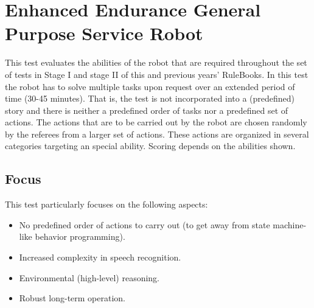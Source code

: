 %
%

\newcommand{\eegpsrTeams}{2~}
\newcommand{\eegpsrMaxCmd}{3~}
\newcommand{\eegpsrMaxCmdTime}{5~}
\newcommand{\eegpsrMaxTeamTime}{\eegpsrMaxCmd$\times$\eegpsrMaxCmdTime}

\section[EEGPSR]{Enhanced Endurance General Purpose Service Robot}
\label{sec:eegpsr}

%
%
This test evaluates the abilities of the robot that are required throughout the set of tests in Stage I and stage II of this and previous years' RuleBooks. In this test the robot has to solve multiple tasks upon request over an extended period of time (30-45 minutes). That is, the test is not incorporated into a (predefined) story and there is neither a predefined order of tasks nor a predefined set of actions. The actions that are to be carried out by the robot are chosen randomly by the referees from a larger set of actions. These actions are organized in several categories targeting an special ability. Scoring depends on the abilities shown.

\subsection{Focus}
This test particularly focuses on the following aspects:
\begin{itemize}
	\item No predefined order of actions to carry out (to get away from state machine-like behavior programming).
	\item Increased complexity in speech recognition.
	\item Environmental (high-level) reasoning.
	\item Robust long-term operation.
\end{itemize}


